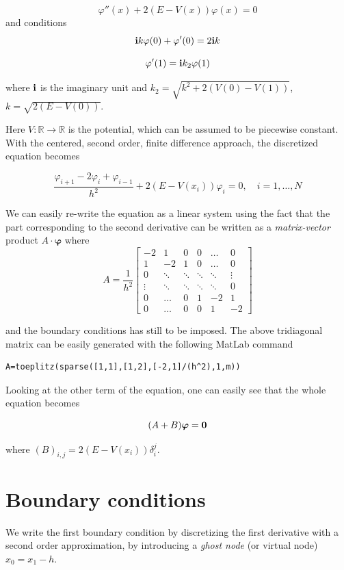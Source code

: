 \documentclass[a4paper,oneside]{book}
\theoremstyle{definition}
\theoremstyle{plain}
\newcommand{\var}{\varphi}
\begin{document}
\[ \var''(x)+2(E-V(x))\var(x)=0 \]
 and conditions 
 \[ \bold{i} k \var(0)+\var'(0)=2\bold{i}k \] 
 
 \[ \var'(1)=\bold{i} k_2\var(1) \]


where $\bold{i}$ is the imaginary unit and $k_2=\sqrt{k^2+2(V(0)-V(1))}$, $k=\sqrt{2(E-V(0))}$.


Here $V:\mathbb{R} \rightarrow \mathbb{R}$ is the potential, which can be assumed to be piecewise constant. %
With the centered, second order, finite difference approach, the discretized equation becomes

 \[ \frac{\var_{i+1}-2\var_i +\var_{i-1}}{h^2}+2(E-V(x_i))\var_i=0, \quad i =1,\ldots, N\]


We can easily re-write the equation as a linear system using the fact that the part corresponding to the second derivative can be written as a \emph{matrix-vector} product $ A \cdot \boldsymbol{\var} $
where\[A= \frac{1}{h^2}
\begin{bmatrix}
-2& 1 & 0 & 0 & \dots & 0 \\
1 & -2 & 1 & 0 & \dots & 0 \\
0 & \ddots & \ddots & \ddots & \ddots & \vdots \\
\vdots & \ddots & \ddots & \ddots & \ddots & 0 \\
0 & \dots & 0 & 1 & -2 & 1 \\
0 & \dots & 0 & 0 & 1 & -2
\end{bmatrix} 
\]

and the boundary conditions has still to be imposed. The above tridiagonal matrix can be easily generated with the following MatLab command
\begin{verbatim}
A=toeplitz(sparse([1,1],[1,2],[-2,1]/(h^2),1,m))
\end{verbatim}

Looking at the other term of the equation, one can easily see that the whole equation becomes 

\[ (A+B) \boldsymbol{\var} = \bold{0}\]

where $(B)_{i,j}=2(E-V(x_i)) \delta_{i}^{j}$.




\section{Boundary conditions}

We write the first boundary condition by discretizing the first derivative with a second order approximation, by introducing a \emph{ghost node} (or virtual node) $x_0=x_1-h$.
\end{document}

